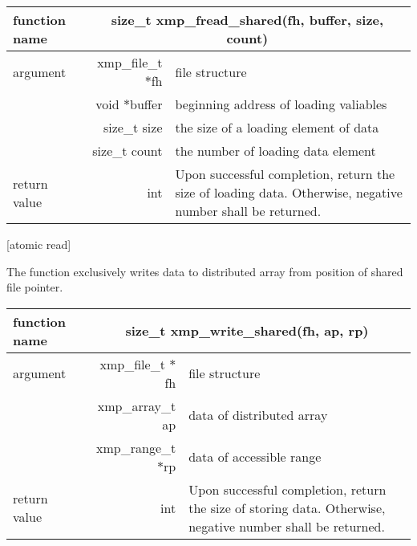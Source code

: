    \begin{table}[h]
    \begin{center}
     \begin{tabular}{|l|r|p{80mm}|}
      \hline
      {\bf function name}  & \multicolumn{2}{c|}{\bf size\_t
      xmp\_fread\_shared(fh, buffer, size, count)}  \\ \hline \hline
      argument & xmp\_file\_t $*$fh & file structure \\ \cline{2-3}
      & void $*$buffer & beginning address of loading valiables \\ \cline{2-3}
      & size\_t size & the size of a loading element of data \\ \cline{2-3}
      & size\_t count & the number of loading data element \\ \hline
      return value & int & Upon successful completion, return the size
	      of loading data. Otherwise, negative number shall be
	      returned. \\ \hline
      \end{tabular}
     \end{center}
    \label{tb:aaa}
   \end{table}


   [atomic read]

   The function exclusively writes data to distributed array from
   position of shared file pointer.

   \begin{table}[h]
    \begin{center}
     \begin{tabular}{|l|r|p{80mm}|}
      \hline
      {\bf function name}  & \multicolumn{2}{c|}{\bf size\_t
      xmp\_write\_shared(fh, ap, rp)} \\ \hline \hline
      argument & xmp\_file\_t $*$fh & file structure \\ \cline{2-3}
      & xmp\_array\_t ap & data of distributed array \\ \cline{2-3}
      & xmp\_range\_t $*$rp & data of accessible range \\ \hline
      return value & int & Upon successful completion, return the size
	      of storing data. Otherwise, negative number shall be
	      returned. \\ \hline
      \end{tabular}
     \end{center}
    \label{tb:aaa}
   \end{table}


